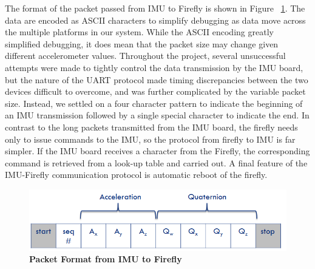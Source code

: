 \documentclass[conference]{IEEEtran}
\begin{document}
  The format of the packet passed from IMU to Firefly is shown in
Figure ~\ref{fig:packet}. The data are encoded as ASCII characters to simplify debugging
as data move across the multiple platforms in our system. While the ASCII
encoding greatly simplified debugging, it does mean that the packet size may change given
different accelerometer values.  Throughout the project, several unsuccessful attempts
were made to tightly control the data transmission by the IMU board, but the nature of the
UART protocol made timing discrepancies between the two devices difficult to overcome, and
was further complicated by the variable packet size. Instead, we settled on a four
character pattern to indicate the beginning of an IMU transmission followed by a single
special character to indicate the end. In contrast to the long packets transmitted from
the IMU board, the firefly needs only to issue commands to the IMU, so the protocol from
firefly to IMU is far simpler. If the IMU board receives a character from the Firefly, the
corresponding command is retrieved from a look-up table and carried out. A final feature
of the IMU-Firefly communication protocol is automatic reboot of the firefly. 

\begin{figure}[h]
  \centering
  \includegraphics[width=0.8\columnwidth]{figs/packet}
  \caption{{\bf Packet Format from IMU to Firefly}}
  \label{fig:packet}
\end{figure}
\end{document}
